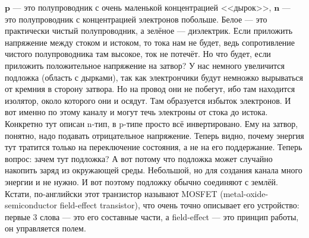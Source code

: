 \documentclass{article}
\begin{document}
    $\mathbf p$ --- это полупроводник с очень маленькой концентрацией <<дырок>>, $\mathbf n$ --- это полупроводник с концентрацией электронов побольше. Белое --- это практически чистый полупроводник, а зелёное --- диэлектрик. Если приложить напряжение между стоком и истоком, то тока нам не будет, ведь сопротивление чистого полупроводника там высокое, ток не потечёт. Но что будет, если приложить положительное напряжение на затвор? У нас немного увеличится подложка (область с дырками), так как электрончики будут немножко вырываться от кремния в сторону затвора. Но на провод они не побегут, ибо там находится изолятор, около которого они и осядут. Там образуется избыток электронов. И вот именно по этому каналу и могут течь электроны от стока до истока. Конкретно тут описан n-тип, в p-типе просто всё инвертировано. Ему на затвор, понятно, надо подавать отрицательное напряжение. Теперь видно, почему энергия тут тратится только на переключение состояния, а не на его поддержание. Теперь вопрос: зачем тут подложка? А вот потому что подложка может случайно накопить заряд из окружающей среды. Небольшой, но для создания канала много энергии и не нужно. И вот поэтому подложку обычно соединяют с землёй. Кстати, по-английски этот транзистор называют MOSFET (metal-oxide-semiconductor field-effect transistor), что очень точно описывает его устройство: первые 3 слова --- это его составные части, а field-effect --- это принцип работы, он управляется полем.
\end{document}
